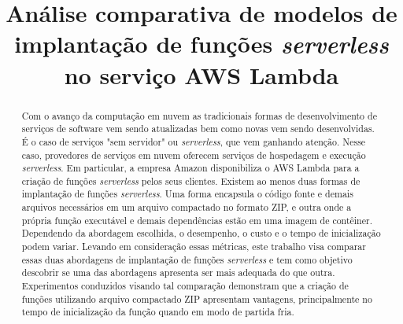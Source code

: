 \documentclass[conference]{IEEEtran}
\begin{document}

\title{Análise comparativa de modelos de implantação de funções \textit{serverless} no serviço AWS Lambda}

\author{
\and
{}
}

\maketitle

\begin{abstract}

Com o avanço da computação em nuvem as tradicionais formas de desenvolvimento de serviços de software vem sendo atualizadas bem como novas vem sendo desenvolvidas. É o caso de serviços "sem servidor" ou \textit{serverless}, que vem ganhando atenção. Nesse caso, provedores de serviços em nuvem oferecem serviços de hospedagem e execução \textit{serverless}. Em particular, a empresa Amazon disponibiliza o AWS Lambda para a criação de funções \textit{serverless} pelos seus clientes. Existem ao menos duas formas de implantação de funções \textit{serverless}. Uma forma encapsula o código fonte e demais arquivos necessários em um arquivo compactado no formato ZIP, e outra onde a própria função executável e demais dependências estão em uma imagem de contêiner. Dependendo da abordagem escolhida, o desempenho, o custo e o tempo de inicialização podem variar. Levando em consideração essas métricas, este trabalho visa comparar essas duas abordagens de implantação de funções \textit{serverless} e tem como objetivo descobrir se uma das abordagens apresenta ser mais adequada do que outra. Experimentos conduzidos visando tal comparação demonstram que a criação de funções utilizando arquivo compactado ZIP apresentam vantagens, principalmente no tempo de inicialização da função quando 
em modo de partida fria. 
\end{abstract}
\end{document}
